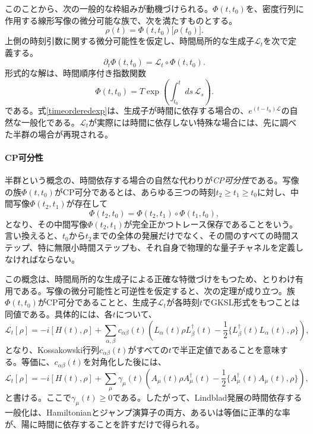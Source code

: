 \documentclass[a4paper,11pt,oneside]{article}
\theoremstyle{definition}
\numberwithin{equation}{section}
\begin{document}
このことから、次の一般的な枠組みが動機づけられる。\(\Phi(t,t_0)\)を、密度行列に作用する線形写像の微分可能な族で、次を満たすものとする。
\begin{equation}
\rho(t)=\Phi(t,t_0)\bigl[\rho(t_0)\bigr] .
\end{equation}
上側の時刻引数に関する微分可能性を仮定し、時間局所的な生成子\(\mathcal L_t\)を次で定義する。
\begin{equation}\label{timelocalgenerator}
\partial_t \Phi(t,t_0)=\mathcal L_t\circ \Phi(t,t_0) .
\end{equation}
形式的な解は、時間順序付き指数関数
\begin{equation}\label{timeorderedexp}
\Phi(t,t_0)
=
T\exp\!\left(
\int_{t_0}^{t} ds\,\mathcal L_s
\right) .
\end{equation}
である。式\eqref{timeorderedexp}は、生成子が時間に依存する場合の、\(e^{(t-t_0)\mathcal L}\)の自然な一般化である。\(\mathcal L_t\)が実際には時間に依存しない特殊な場合には、先に調べた半群の場合が再現される。



\paragraph{CP可分性} 半群という概念の、時間依存する場合の自然な代わりが\textit{CP可分性}である。写像の族\(\Phi(t,t_0)\)がCP可分であるとは、あらゆる三つの時刻\(t_2\ge t_1\ge t_0\)に対し、中間写像\(\Phi(t_2,t_1)\)が存在して
\begin{equation}
\Phi(t_2,t_0)=\Phi(t_2,t_1)\circ \Phi(t_1,t_0) ,
\end{equation}
となり、その中間写像\(\Phi(t_2,t_1)\)が完全正かつトレース保存であることをいう。言い換えると、\(t_0\)から\(t_2\)までの全体の発展だけでなく、その間のすべての時間ステップ、特に無限小時間ステップも、それ自身で物理的な量子チャネルを定義しなければならない。



この概念は、時間局所的な生成子による正確な特徴づけをもつため、とりわけ有用である。写像の微分可能性と可逆性を仮定すると、次の定理が成り立つ。族\(\Phi(t,t_0)\)がCP可分であることと、生成子\(\mathcal L_t\)が各時刻\(t\)でGKSL形式をもつことは同値である。具体的には、各\(t\)について、
\begin{equation}\label{timedepGKSL}
\mathcal L_t[\rho]
=
-i[H(t),\rho]
+
\sum_{\alpha,\beta} c_{\alpha\beta}(t)
\left(
L_\alpha(t)\rho L_\beta^\dagger(t)
-\frac12\{L_\beta^\dagger(t)L_\alpha(t),\rho\}
\right) ,
\end{equation}
となり、Kossakowski行列\(c_{\alpha\beta}(t)\)がすべての\(t\)で半正定値であることを意味する。等価に、\(c_{\alpha\beta}(t)\)を対角化した後には、
\begin{equation}
\mathcal L_t[\rho]
=
-i[H(t),\rho]
+
\sum_\mu \gamma_\mu(t)
\left(
A_\mu(t)\rho A_\mu^\dagger(t)
-\frac12\{A_\mu^\dagger(t)A_\mu(t),\rho\}
\right) ,
\end{equation}
と書ける。ここで$  \gamma_\mu(t)\ge 0  $である。したがって、Lindblad発展の時間依存する一般化は、Hamiltonianとジャンプ演算子の両方、あるいは等価に正準的な率が、陽に時間に依存することを許すだけで得られる。
\end{document}
